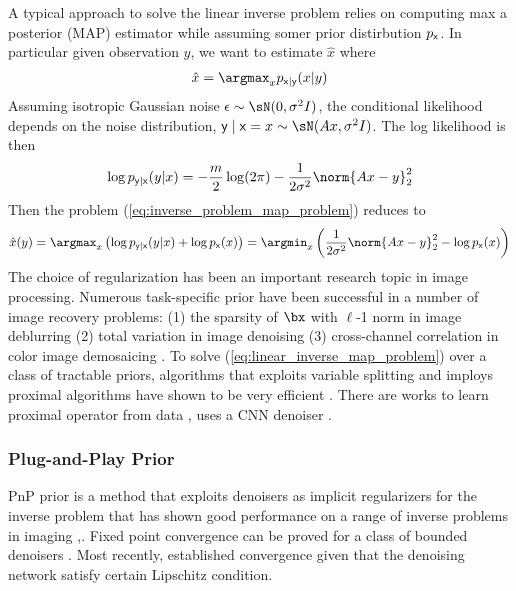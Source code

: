 \documentclass[../writeup.tex]{subfiles}
\begin{document}
A typical approach to solve the linear inverse problem relies on computing max a posterior (MAP) estimator while assuming somer prior distirbution $p_{\mathsf{x}}$. In particular given observation $y$, we want to estimate $\hat{x}$ where
\begin{align}
    \hat{x}
        = \argmax_{x} p_{\rx|\ry}(x|y)
    \label{eq:inverse_problem_map_problem}
\end{align}
Assuming isotropic Gaussian noise $\epsilon \sim \sN(0,\sigma^2 I)$, the conditional likelihood depends on the noise distribution, $\ry\mid \rx=x \sim \sN(Ax, \sigma^2 I)$. The log likelihood is then
\begin{align}
    \log p_{\ry|\rx}(y|x)
        = -\frac{m}{2} \log (2\pi) - \frac{1}{2\sigma^2} \norm{Ax - y}_2^2 
\end{align}
Then the problem (\ref{eq:inverse_problem_map_problem}) reduces to
\begin{align}
    \hat{x}(y)
        = \argmax_{x} \left(
            \log p_{\ry|\rx}(y|x) + \log p_{\rx}(x) 
        \right)
        = \argmin_{x} \left(
            \frac{1}{2\sigma^2} \norm{Ax-y}_2^2 - \log p_{\rx}(x)
        \right)
        \label{eq:linear_inverse_map_problem}
\end{align}
The choice of regularization has been an important research topic in image processing. Numerous task-specific prior have been successful in a number of image recovery problems: (1) the sparsity of $\bx$ with $\ell$-1 norm in image deblurring \cite{beckFastIterativeShrinkageThresholding2009} (2) total variation in image denoising \cite{buadesNonlocalImageMovie2008} (3) cross-channel correlation in color image demosaicing \cite{malvarHighqualityLinearInterpolation2004}. To solve (\ref{eq:linear_inverse_map_problem}) over a class of tractable priors, algorithms that exploits variable splitting and imploys proximal algorithms have shown to be very efficient \cite{afonsoFastImageRecovery2010, figueiredoRestorationPoissonianImages2010, heideFlexISPFlexibleCamera2014,heideProxImaLEfficientImage2016}. There are works to learn proximal operator from data \cite{meinhardtLearningProximalOperators2017,changOneNetworkSolve2017}, uses a CNN denoiser \cite{zhangGaussianDenoiserResidual2017}.



\subsubsection{Plug-and-Play Prior}

PnP prior is a method that exploits denoisers as implicit regularizers for the inverse problem that has shown good performance on a range of inverse problems in imaging \cite{chanPlugandPlayADMMImage2016},\cite{chanAlgorithmInducedPriorImage2016}. Fixed point convergence can be proved for a class of bounded denoisers \cite{chanPlugandPlayADMMImage2016}. Most recently, \cite{ryuPlugandPlayMethodsProvably2019} established convergence given that the denoising network satisfy certain Lipschitz condition.
\end{document}

